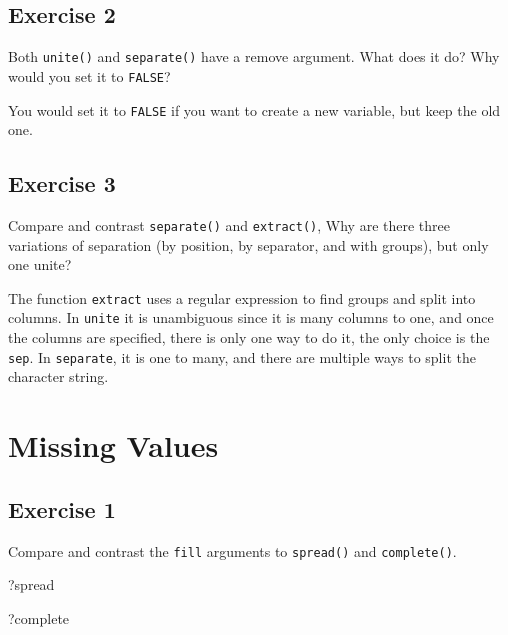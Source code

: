 \documentclass[]{book}
\newenvironment{Shaded}{\begin{snugshade}}{\end{snugshade}}
\newcommand{\NormalTok}[1]{#1}
\theoremstyle{definition}
\theoremstyle{definition}
\theoremstyle{definition}
\theoremstyle{remark}
\begin{document}
\hypertarget{exercise-2-17}{%
\subsection{Exercise 2}\label{exercise-2-17}}

Both \texttt{unite()} and \texttt{separate()} have a remove argument.
What does it do? Why would you set it to \texttt{FALSE}?

You would set it to \texttt{FALSE} if you want to create a new variable,
but keep the old one.

\hypertarget{exercise-3-15}{%
\subsection{Exercise 3}\label{exercise-3-15}}

Compare and contrast \texttt{separate()} and \texttt{extract()}, Why are
there three variations of separation (by position, by separator, and
with groups), but only one unite?

The function \texttt{extract} uses a regular expression to find groups
and split into columns. In \texttt{unite} it is unambiguous since it is
many columns to one, and once the columns are specified, there is only
one way to do it, the only choice is the \texttt{sep}. In
\texttt{separate}, it is one to many, and there are multiple ways to
split the character string.

\hypertarget{missing-values-1}{%
\section{Missing Values}\label{missing-values-1}}

\hypertarget{exercise-1-19}{%
\subsection{Exercise 1}\label{exercise-1-19}}

Compare and contrast the \texttt{fill} arguments to \texttt{spread()}
and \texttt{complete()}.

\begin{Shaded}
\begin{Highlighting}[]
\NormalTok{?spread}
\end{Highlighting}
\end{Shaded}

\begin{Shaded}
\begin{Highlighting}[]
\NormalTok{?complete}
\end{Highlighting}
\end{Shaded}
\end{document}
